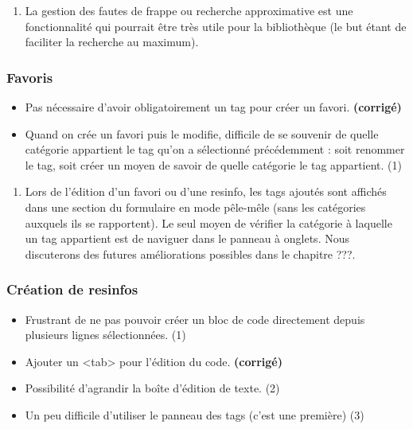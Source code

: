 \begin{enumerate}
    \item La gestion des fautes de frappe ou recherche approximative est une fonctionnalité qui pourrait être très utile pour la bibliothèque (le but étant de faciliter la recherche au maximum).
\end{enumerate}

\subsubsection*{Favoris}

\begin{itemize}
    \item Pas nécessaire d'avoir obligatoirement un tag pour créer un favori. \textbf{(corrigé)}
    \item Quand on crée un favori puis le modifie, difficile de se souvenir de quelle catégorie appartient le tag qu'on a sélectionné précédemment : soit renommer le tag, soit créer un moyen de savoir de quelle catégorie le tag appartient. (1)
\end{itemize}

\bigskip

\begin{enumerate}
    \item Lors de l'édition d'un favori ou d'une \gls{resinfo}, les \glspl{tag} ajoutés sont affichés dans une section du formulaire en mode pêle-mêle (sans les catégories auxquels ils se rapportent). Le seul moyen de vérifier la catégorie à laquelle un \gls{tag} appartient est de naviguer dans le panneau à onglets. Nous discuterons des futures améliorations possibles dans le chapitre ???.
\end{enumerate}


\subsubsection*{Création de \glspl{resinfo}}

\begin{itemize}
    \item Frustrant de ne pas pouvoir créer un bloc de code directement depuis plusieurs lignes sélectionnées. (1)
    \item Ajouter un <tab> pour l'édition du code. \textbf{(corrigé)}
    \item Possibilité d'agrandir la boîte d'édition de texte. (2)
    \item Un peu difficile d'utiliser le panneau des tags (c'est une première) (3)
\end{itemize}

